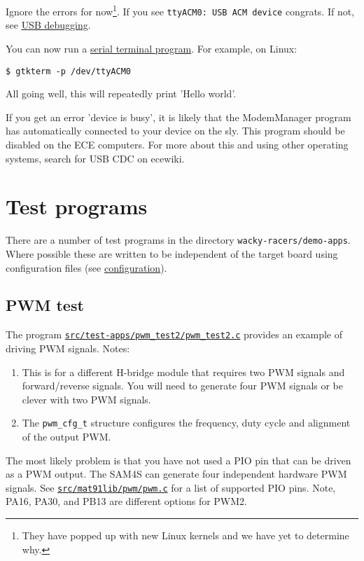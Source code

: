 Ignore the errors for now\footnote{They have popped up with new Linux
  kernels and we have yet to determine why.}. If you see
\texttt{ttyACM0:\ USB\ ACM\ device} congrats. If not, see
\href{USB_debugging}{USB debugging}.

You can now run a \href{Serial_terminal_applications}{serial terminal
program}. For example, on Linux:

\begin{verbatim}
$ gtkterm -p /dev/ttyACM0
\end{verbatim}

All going well, this will repeatedly print 'Hello world'.

If you get an error 'device is busy', it is likely that the ModemManager
program has automatically connected to your device on the sly. This
program should be disabled on the ECE computers. For more about this and
using other operating systems, search for USB CDC on ecewiki.

\section{Test programs}
\label{test-programs}

There are a number of test programs in the directory
\texttt{wacky-racers/demo-apps}. Where possible these are written to be
independent of the target board using configuration files (see
\protect\hyperref[configuration]{configuration}).

\subsection{PWM test}
\label{pwm-test}

The program
\href{https://eng-git.canterbury.ac.nz/mph/wacky-racers-2021/blob/master/src/test-apps/pwm_test2/pwm_test2.c}{\texttt{src/test-apps/pwm\_test2/pwm\_test2.c}}
provides an example of driving PWM signals. Notes:
%
\begin{enumerate}
\item
  This is for a different H-bridge module that requires two PWM signals
  and forward/reverse signals. You will need to generate four PWM
  signals or be clever with two PWM signals.
\item
  The \texttt{pwm\_cfg\_t} structure configures the frequency, duty
  cycle and alignment of the output PWM.
\end{enumerate}

The most likely problem is that you have not used a PIO pin that can be
driven as a PWM output. The SAM4S can generate four independent hardware
PWM signals. See
\href{https://eng-git.canterbury.ac.nz/mph/wacky-racers-2021/blob/master/src/mat91lib/pwm/pwm.c}{\texttt{src/mat91lib/pwm/pwm.c}}
for a list of supported PIO pins. Note, PA16, PA30, and PB13 are
different options for PWM2.

